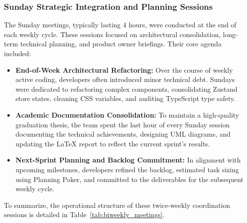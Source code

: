 \subsubsection{Sunday Strategic Integration and Planning Sessions}
The Sunday meetings, typically lasting 4 hours, were conducted at the end of each weekly cycle. These sessions focused on architectural consolidation, long-term technical planning, and product owner briefings. Their core agenda included:
\begin{itemize}
    \item \textbf{End-of-Week Architectural Refactoring:} Over the course of weekly active coding, developers often introduced minor technical debt. Sundays were dedicated to refactoring complex components, consolidating Zustand store states, cleaning CSS variables, and auditing TypeScript type safety.
    \item \textbf{Academic Documentation Consolidation:} To maintain a high-quality graduation thesis, the team spent the last hour of every Sunday session documenting the technical achievements, designing UML diagrams, and updating the LaTeX report to reflect the current sprint's results.
    \item \textbf{Next-Sprint Planning and Backlog Commitment:} In alignment with upcoming milestones, developers refined the backlog, estimated task sizing using Planning Poker, and committed to the deliverables for the subsequent weekly cycle.
\end{itemize}

To summarize, the operational structure of these twice-weekly coordination sessions is detailed in Table~\ref{tab:biweekly_meetings}.

